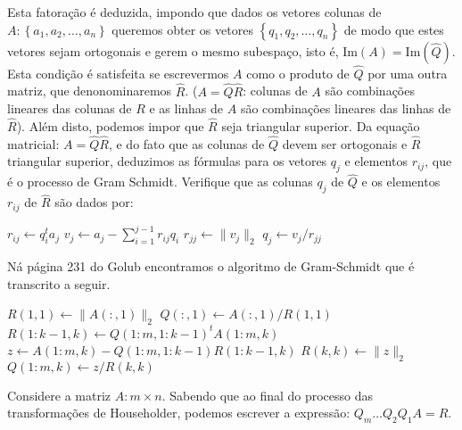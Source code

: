 \begin{questions}
    Esta fatora\c{c}\~{a}o \'{e} deduzida, impondo que dados os vetores colunas de $A : \left\{ a_1, a_2, \ldots, a_n \right\}$ queremos obter os vetores $\left\{ q_1, q_2, \ldots, q_n \right\}$ de modo que estes vetores sejam ortogonais e gerem o mesmo subespa\c{c}o, isto \'{e}, $\text{Im}(A) = \text{Im}(\hat{Q})$. Esta condi\c{c}\~{a}o \'{e} satisfeita se escrevermos $A$ como o produto de $\hat{Q}$ por uma outra matriz, que denonominaremos $\hat{R}$. ($A = \hat{Q} \hat{R}$: colunas de $A$ s\~{a}o combina\c{c}\~{o}es lineares das colunas de $R$ e as linhas de $A$ s\~{a}o combina\c{c}\~{o}es lineares das linhas de $\hat{R}$). Al\'{e}m disto, podemos impor que $\hat{R}$ seja triangular superior. Da equa\c{c}\~{a}o matricial: $A = \hat{Q} \hat{R}$, e do fato que as colunas de $\hat{Q}$ devem ser ortogonais e $\hat{R}$ triangular superior, deduzimos as f\'{o}rmulas para os vetores $q_j$ e elementos $r_{ij}$, que \'{e} o processo de Gram Schmidt. Verifique que as colunas $q_j$ de $\hat{Q}$ e os elementos $r_{ij}$ de $\hat{R}$ s\~{a}o dados por:
    \begin{algorithmic}
                \State $r_{ij} \leftarrow q_i^t a_j$
            \EndFor
            \State $v_j \leftarrow a_j - \sum_{i = 1}^{j - 1} r_{ij} q_i$
            \State $r_{jj} \leftarrow \| v_j \|_2$
            \State $q_j \leftarrow v_j / r_{jj}$
        \EndFor
    \end{algorithmic}
    \begin{solution}
        N\'{a} p\'{a}gina 231 do Golub\nocite{Golub:1996:matrix} encontramos o algoritmo de Gram-Schmidt que \'{e} transcrito a seguir.
    \begin{algorithmic}
        \State $R(1, 1) \leftarrow \| A(:, 1) \|_2$
        \State $Q(:, 1) \leftarrow A(:, 1) / R(1, 1)$
            \State $R(1:k - 1, k) \leftarrow Q(1:m, 1:k - 1)^t A(1:m, k)$
            \State $z \leftarrow A(1:m, k) - Q(1:m, 1:k - 1) R(1:k - 1, k)$
            \State $R(k, k) \leftarrow \| z \|_2$
            \State $Q(1:m, k) \leftarrow z / R(k, k)$
        \EndFor
    \end{algorithmic}
    \end{solution}

    \question Considere a matriz $A: m \times n$. Sabendo que ao final do processo das transforma\c{c}\~{o}es de Householder, podemos escrever a express\~{a}o: $Q_m \ldots Q_2 Q_1 A = R$.
    \begin{parts}

\end{parts}
\end{questions}
